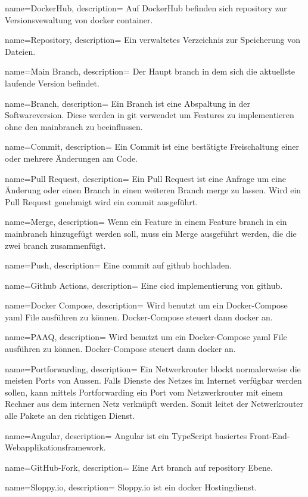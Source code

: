 {
	name=DockerHub,
	description={
		Auf DockerHub befinden sich \gls{repository} zur Versionsvewaltung von \gls{docker} \gls{container}.
	}
}

{
	name=Repository,
	description={
		Ein verwaltetes Verzeichnis zur Speicherung von Dateien.
	}
}

{
	name=Main Branch,
	description={
		Der Haupt \gls{branch} in dem sich die aktuellste laufende Version befindet.
	}
}

{
	name=Branch,
	description={
		Ein Branch ist eine Abspaltung in der Softwareversion. Diese werden in \gls{git} verwendet um Features zu implementieren ohne den \gls{mainbranch} zu beeinflussen.
	}
}

{
	name=Commit,
	description={
		Ein Commit ist eine bestätigte Freischaltung einer oder mehrere Änderungen am Code.
	}
}

{
	name=Pull Request,
	description={
		Ein Pull Request ist eine Anfrage um eine Änderung oder einen Branch in einen weiteren Branch \gls{merge} zu lassen. Wird ein Pull Request genehmigt wird ein \gls{commit} ausgeführt.
	}
}

{
	name=Merge,
	description={
		Wenn ein Feature in einem Feature \gls{branch} in ein \gls{mainbranch} hinzugefügt werden soll, muss ein Merge ausgeführt werden, die die zwei \gls{branch} zusammenfügt.
	}
}

{
	name=Push,
	description={
		Eine \gls{commit} auf \gls{github} hochladen.
	}
}

{
	name=Github Actions,
	description={
		Eine \gls{cicd} implementierung von \gls{github}.
	}
}

{
	name=Docker Compose,
	description={
		Wird benutzt um ein Docker-Compose \gls{yaml} File ausführen zu können. Docker-Compose steuert dann \gls{docker} an.
	}
}

{
	name=PAAQ,
	description={
		Wird benutzt um ein Docker-Compose \gls{yaml} File ausführen zu können. Docker-Compose steuert dann \gls{docker} an.
	}
}

{
	name=Portforwarding,
	description={
		Ein Netwerkrouter blockt normalerweise die meisten Ports von Aussen. Falls Dienste des Netzes im Internet verfügbar werden sollen, kann mittels Portforwarding ein Port vom Netzwerkrouter mit einem Rechner aus dem internen Netz verknüpft werden. Somit leitet der Netwerkrouter alle Pakete an den richtigen Dienst.
	}
}

{
	name=Angular,
	description={
		Angular ist ein TypeScript basiertes Front-End-Webapplikationsframework.
	}
}

{
	name=GitHub-Fork,
	description={
		Eine Art \gls{branch} auf \gls{repository} Ebene.
	}
}

{
	name=Sloppy.io,
	description={
		Sloppy.io ist ein \gls{docker} Hostingdienst.
	}
}
